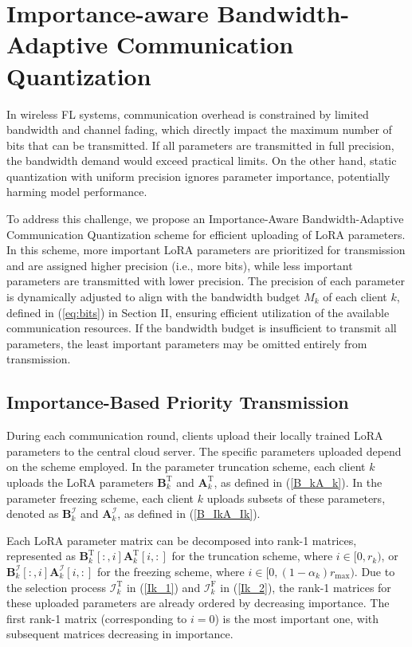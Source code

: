 \documentclass[journal]{IEEEtran}
\begin{document}
\section{Importance-aware Bandwidth-Adaptive Communication Quantization}
In wireless FL systems, communication overhead is constrained by limited bandwidth and channel fading, which directly impact the maximum number of bits that can be transmitted. If all parameters are transmitted in full precision, the bandwidth demand would exceed practical limits. On the other hand, static quantization with uniform precision ignores parameter importance, potentially harming model performance.

To address this challenge, we propose an Importance-Aware Bandwidth-Adaptive Communication Quantization scheme for efficient uploading of LoRA parameters. In this scheme, more important LoRA parameters are prioritized for transmission and are assigned higher precision (i.e., more bits), while less important parameters are transmitted with lower precision. The precision of each parameter is dynamically adjusted to align with the bandwidth budget $M_k$ of each client $k$, defined in (\ref{eq:bits}) in Section II, ensuring efficient utilization of the available communication resources. If the bandwidth budget is insufficient to transmit all parameters, the least important parameters may be omitted entirely from transmission. 

\subsection{Importance-Based Priority Transmission}
During each communication round, clients upload their locally trained LoRA parameters to the central cloud server. The specific parameters uploaded depend on the scheme employed. In the parameter truncation scheme, each client \(k\) uploads the LoRA parameters \(\mathbf{B}_k^{\text{T}}\) and \(\mathbf{A}_k^{\text{T}}\), as defined in (\ref{B_kA_k}). In the parameter freezing scheme, each client \(k\) uploads subsets of these parameters, denoted as \(\mathbf{B}_k^{\mathcal{I}}\) and \(\mathbf{A}_k^{\mathcal{I}}\), as defined in (\ref{B_IkA_Ik}).

Each LoRA parameter matrix can be decomposed into rank-1 matrices, represented as \(\mathbf{B}_k^{\text{T}}[:,i]\mathbf{A}_k^{\text{T}}[i,:]\) for the truncation scheme, where \(i \in [0, r_k)\), or \(\mathbf{B}_k^{\mathcal{I}}[:,i]\mathbf{A}_k^{\mathcal{I}}[i,:]\) for the freezing scheme, where \(i \in [0, (1-\alpha_k)r_{\text{max}})\). Due to the selection process \(\mathcal{I}_k^{\text{T}}\) in (\ref{Ik_1}) and \(\mathcal{I}_k^{\text{F}}\) in (\ref{Ik_2}), the rank-1 matrices for these uploaded parameters are already ordered by decreasing importance. The first rank-1 matrix (corresponding to \(i=0\)) is the most important one, with subsequent matrices decreasing in importance.
\end{document}
